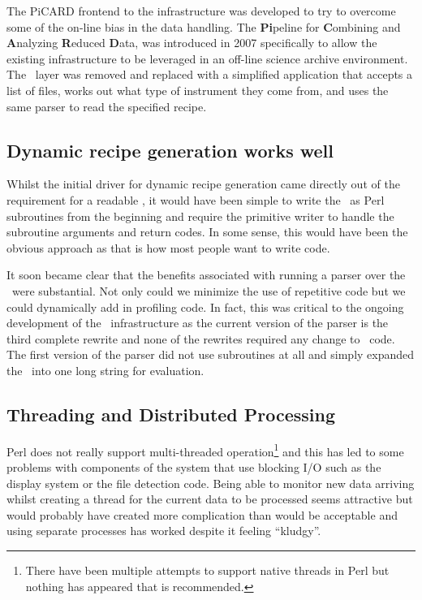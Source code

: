 \documentclass[final,authoryear,5p,times,twocolumn]{elsarticle}
\begin{document}
The PiCARD \citep{SUN265} frontend to the infrastructure was developed
to try to overcome some of the on-line bias in the data handling. The
\textbf{Pi}peline for \textbf{C}ombining and \textbf{A}nalyzing
\textbf{R}educed \textbf{D}ata, was introduced in 2007
\citep{2008ASPC..394..565J} specifically to allow the existing
infrastructure to be leveraged in an off-line science archive
environment. The \oracdr\ layer was removed and replaced with a
simplified application that accepts a list of files, works out what
type of instrument they come from, and uses the same parser to read
the specified recipe.

\subsection{Dynamic recipe generation works well}

Whilst the initial driver for dynamic recipe generation came directly
out of the requirement for a readable \recipe, it would have been
simple to write the \primitives\ as Perl subroutines from the
beginning and require the primitive writer to handle the subroutine
arguments and return codes. In some sense, this would have been the
obvious approach as that is how most people want to write code.

It soon became clear that the benefits associated
with running a parser over the \primitives\ were substantial. Not only
could we minimize the use of repetitive code but we could dynamically
add in profiling code. In fact, this was critical to the ongoing
development of the \oracdr\ infrastructure as the current version of
the parser is the third complete rewrite and none of the rewrites
required any change to \primitive\ code. The first version of the
parser did not use subroutines at all and simply expanded the \recipe\
into one long string for evaluation.

\subsection{Threading and Distributed Processing}

Perl does not really support multi-threaded
operation\footnote{There have been multiple attempts to support native
  threads in Perl but nothing has appeared that is recommended.}
and this has led to some problems with components of the system that
use blocking I/O such as the display system or the file detection
code. Being able to monitor new data arriving whilst creating a thread for the
current data to be processed seems attractive but would probably have
created more complication than would be acceptable and using separate
processes has worked despite it feeling ``kludgy''.
\end{document}
